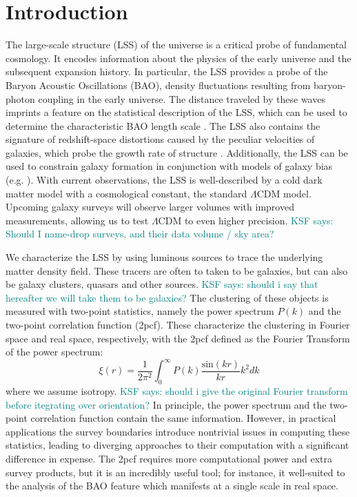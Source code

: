 \documentclass[modern]{aastex62}
\newcommand{\cf}{2pcf\xspace} %
\newcommand{\KSF}[1]{\textcolor{teal}{KSF says: #1}}
\begin{document}

\section{Introduction}

The large-scale structure (LSS) of the universe is a critical probe of fundamental cosmology. 
It encodes information about the physics of the early universe and the subsequent expansion history.
In particular, the LSS provides a probe of the Baryon Acoustic Oscillations (BAO), density fluctuations resulting from baryon-photon coupling in the early universe.
The distance traveled by these waves imprints a feature on the statistical description of the LSS, which can be used to determine the characteristic BAO length scale \citep{EisensteinHu1998}.
The LSS also contains the signature of redshift-space distortions caused by the peculiar velocities of galaxies, which probe the growth rate of structure \citep{Kaiser1987}.
Additionally, the LSS can be used to constrain galaxy formation in conjunction with models of galaxy bias (e.g. \citealt{Hamilton1988}). %
With current observations, the LSS is well-described by a cold dark matter model with a cosmological constant, the standard $\Lambda$CDM model.
Upcoming galaxy surveys will observe larger volumes with improved measurements, allowing us to test $\Lambda$CDM to even higher precision.
\KSF{Should I name-drop surveys, and their data volume / sky area?}

We characterize the LSS by using luminous sources to trace the underlying matter density field.
These tracers are often to taken to be galaxies, but can also be galaxy clusters, quasars and other sources.
\KSF{should i say that hereafter we will take them to be galaxies?}
The clustering of these objects is measured with two-point statistics, namely the power spectrum $P(k)$ and the two-point correlation function (\cf).
These characterize the clustering in Fourier space and real space, respectively, with the \cf defined as the Fourier Transform of the power spectrum: 
\begin{equation}
\xi(r) = \frac{1}{2\pi^2} \int_0^{\infty} P(k) \frac{\mathrm{sin}(kr)}{kr} k^2 dk
\end{equation}
where we assume isotropy. \KSF{should i give the original Fourier transform before itegrating over orientation?}
In principle, the power spectrum and the two-point correlation function contain the same information.
However, in practical applications the survey boundaries introduce nontrivial issues in computing these statistics, leading to diverging approaches to their computation with a significant difference in expense.
The \cf requires more computational power and extra survey products, but it is an incredibly useful tool; for instance, it well-suited to the analysis of the BAO feature which manifests at a single scale in real space.
\end{document}
